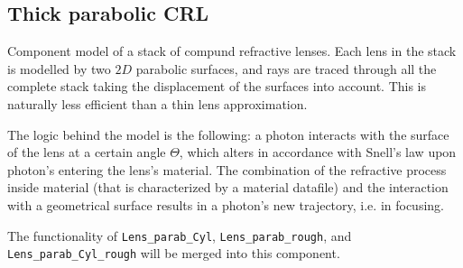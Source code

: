 \subsection*{Thick parabolic CRL}
\label{s:lens-parab}

Component model of a stack of compund refractive lenses. Each lens in the stack
is modelled by two $2D$ parabolic surfaces, and rays are traced through all the
complete stack taking the displacement of the surfaces into account. This is
naturally less efficient than a thin lens approximation.

The logic behind the model is the following: a photon interacts with the
surface of the lens at a certain angle $\Theta$, which alters in accordance
with Snell's law upon photon's entering the lens's material. The combination of
the refractive process inside material (that is characterized by a material
datafile) and the interaction with a geometrical surface results in a photon's
new trajectory, i.e. in focusing.

The functionality of \texttt{Lens\_parab\_Cyl}, \texttt{Lens\_parab\_rough},
and \texttt{Lens\_parab\_Cyl\_rough} will be merged into this component.
